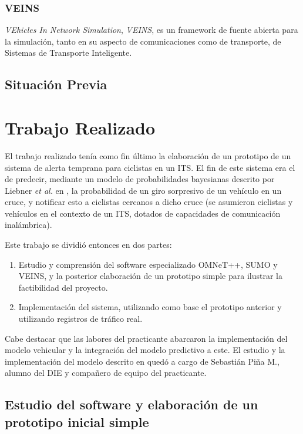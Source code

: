 \documentclass[11pt,letterpaper]{article}
\begin{document}
\subsubsection{VEINS}

\emph{VEhicles In Network Simulation}, \emph{VEINS}, es un framework de fuente abierta para la simulación, tanto en su aspecto de comunicaciones como de transporte, de Sistemas de Transporte Inteligente.


\subsection{Situación Previa}\label{section:situacion_previa}

\newpage
\section{Trabajo Realizado}

El trabajo realizado tenía como fin último la elaboración de un prototipo de un sistema de alerta temprana para ciclistas en un ITS. El fin de este sistema era el de predecir, mediante un modelo de probabilidades bayesianas descrito por Liebner \textit{et al.} en \cite{prediction-paper}, la probabilidad de un giro sorpresivo de un vehículo en un cruce, y notificar esto a ciclistas cercanos a dicho cruce (se asumieron ciclistas y vehículos en el contexto de un ITS, dotados de capacidades de comunicación inalámbrica).

Este trabajo se dividió entonces en dos partes:

\begin{enumerate}
  \item Estudio y comprensión del software especializado OMNeT++, SUMO y VEINS, y la posterior elaboración de un prototipo simple para ilustrar la factibilidad del proyecto.
  \item Implementación del sistema, utilizando como base el prototipo anterior y utilizando registros de tráfico real.
\end{enumerate}

Cabe destacar que las labores del practicante abarcaron la implementación del modelo vehicular y la integración del modelo predictivo a este. El estudio y la implementación del modelo descrito en \cite{prediction-paper} quedó a cargo de Sebastián Piña M., alumno del DIE y compañero de equipo del practicante.

\subsection{Estudio del software y elaboración de un prototipo inicial simple}
\end{document}
